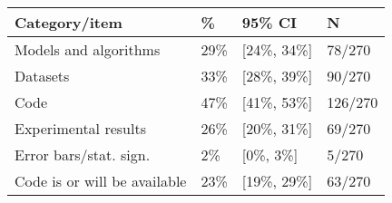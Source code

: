 \begin{tabular}{llll}
\hline
Category/item & \% & 95\% CI  & N \\
\hline
Models and algorithms & 29\% & [24\%, 34\%] & 78/270\\
Datasets & 33\% & [28\%, 39\%] & 90/270\\
Code & 47\% & [41\%, 53\%] & 126/270\\
Experimental results & 26\% & [20\%, 31\%] & 69/270\\
Error bars/stat. sign.& 2\% & [0\%, 3\%] & 5/270\\
Code is or will be available & 23\% & [19\%, 29\%] & 63/270\\
\hline
\end{tabular}

